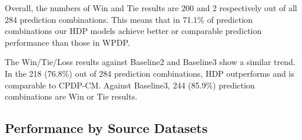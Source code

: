 


Overall, the numbers of Win and
Tie results are 200 and 2 respectively out of all 284 prediction
combinations.
This means that in 71.1\% of prediction combinations our HDP
models achieve better or comparable prediction performance than those in
WPDP.

The Win/Tie/Loss results against Baseline2 and Baseline3 show a similar trend.
In the 218 (76.8\%) out of 284 prediction combinations, HDP outperforms and is comparable to CPDP-CM. Against Baseline3, 244
(85.9\%) prediction combinations are Win or Tie results.



\subsection{Performance by Source Datasets}
\label{subsec04-0}


